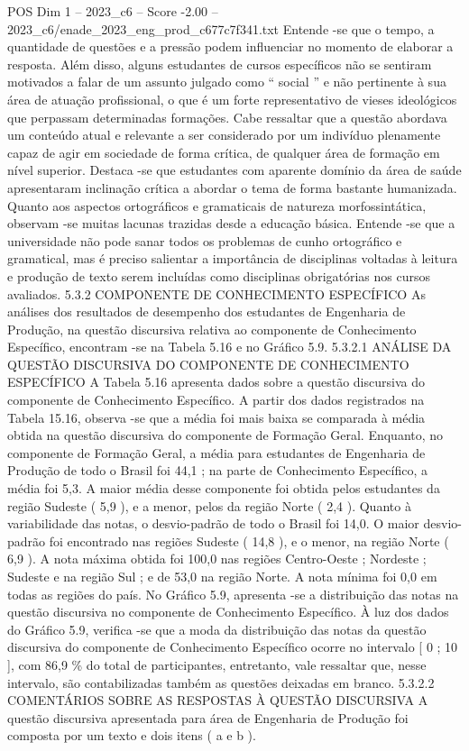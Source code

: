 \begin{textsample}{POS Dim 1 – 2023\_c6 – Score -2.00 – 2023\_c6/enade\_2023\_eng\_prod\_c677c7f341.txt}
Entende -se que o tempo, a quantidade de questões e a pressão podem influenciar no momento de elaborar a resposta.
Além disso, alguns estudantes de cursos específicos não se sentiram motivados a falar de um assunto julgado como “ social ” e não pertinente à sua área de atuação profissional, o que é um forte representativo de vieses ideológicos que perpassam determinadas formações.
Cabe ressaltar que a questão abordava um conteúdo atual e relevante a ser considerado por um indivíduo plenamente capaz de agir em sociedade de forma crítica, de qualquer área de formação em nível superior.
Destaca -se que estudantes com aparente domínio da área de saúde apresentaram inclinação crítica a abordar o tema de forma bastante humanizada.
Quanto aos aspectos ortográficos e gramaticais de natureza morfossintática, observam -se muitas lacunas trazidas desde a educação básica.
Entende -se que a universidade não pode sanar todos os problemas de cunho ortográfico e gramatical, mas é preciso salientar a importância de disciplinas voltadas à leitura e produção de texto serem incluídas como disciplinas obrigatórias nos cursos avaliados. 5.3.2 COMPONENTE DE CONHECIMENTO ESPECÍFICO As análises dos resultados de desempenho dos estudantes de Engenharia de Produção, na questão discursiva relativa ao componente de Conhecimento Específico, encontram -se na Tabela 5.16 e no Gráfico 5.9. 5.3.2.1 ANÁLISE DA QUESTÃO DISCURSIVA DO COMPONENTE DE CONHECIMENTO ESPECÍFICO A Tabela 5.16 apresenta dados sobre a questão discursiva do componente de Conhecimento Específico.
A partir dos dados registrados na Tabela 15.16, observa -se que a média foi mais baixa se comparada à média obtida na questão discursiva do componente de Formação Geral.
Enquanto, no componente de Formação Geral, a média para estudantes de Engenharia de Produção de todo o Brasil foi 44,1 ; na parte de Conhecimento Específico, a média foi 5,3.
A maior média desse componente foi obtida pelos estudantes da região Sudeste ( 5,9 ), e a menor, pelos da região Norte ( 2,4 ).
Quanto à variabilidade das notas, o desvio-padrão de todo o Brasil foi 14,0.
O maior desvio-padrão foi encontrado nas regiões Sudeste ( 14,8 ), e o menor, na região Norte ( 6,9 ).
A nota máxima obtida foi 100,0 nas regiões Centro-Oeste ; Nordeste ; Sudeste e na região Sul ; e de 53,0 na região Norte.
A nota mínima foi 0,0 em todas as regiões do país.
No Gráfico 5.9, apresenta -se a distribuição das notas na questão discursiva no componente de Conhecimento Específico.
À luz dos dados do Gráfico 5.9, verifica -se que a moda da distribuição das notas da questão discursiva do componente de Conhecimento Específico ocorre no intervalo [ 0 ; 10 ], com 86,9 \% do total de participantes, entretanto, vale ressaltar que, nesse intervalo, são contabilizadas também as questões deixadas em branco. 5.3.2.2 COMENTÁRIOS SOBRE AS RESPOSTAS À QUESTÃO DISCURSIVA A questão discursiva apresentada para área de Engenharia de Produção foi composta por um texto e dois itens ( a e b ).

\end{textsample}
